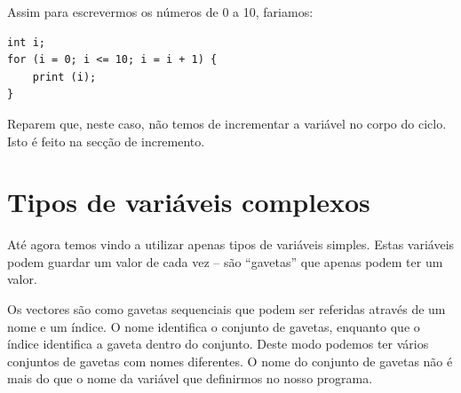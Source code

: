 Assim para escrevermos os números de 0 a 10, fariamos:
\begin{lstlisting}
int i;
for (i = 0; i <= 10; i = i + 1) {
    print (i);
}
\end{lstlisting}
Reparem que, neste caso, não temos de incrementar a variável no corpo do ciclo. Isto é feito na secção de incremento.



\section{Tipos de variáveis complexos}
Até agora temos vindo a utilizar apenas tipos de variáveis simples. Estas variáveis podem guardar um valor de cada vez -- são ``gavetas'' que apenas podem ter um valor. 

Os vectores são como gavetas sequenciais que podem ser referidas através de um nome e um índice. O nome identifica o conjunto de gavetas, enquanto que o índice identifica a gaveta dentro do conjunto. Deste modo podemos ter vários conjuntos de gavetas com nomes diferentes.
O nome do conjunto de gavetas não é mais do que o nome da variável que definirmos no nosso programa.

